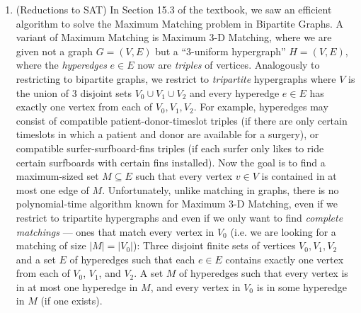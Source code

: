 \documentclass[11pt]{article}
\begin{document}
\begin{enumerate}
\[\varphi(x_0, x_1, x_2, x_3) = (x_0 \vee x_1) \wedge (\neg x_0 \vee x_2) \wedge (\neg x_1 \vee \neg x_2) \wedge (x_2 \vee x_3)\]

\item (Reductions to SAT) In Section 15.3 of the textbook, we saw an efficient algorithm to solve the Maximum Matching problem in Bipartite Graphs. A variant of Maximum Matching is Maximum 3-D Matching, where we are given not a graph $G=(V,E)$ but a ``3-uniform hypergraph'' $H=(V,E)$, where the {\em hyperedges} $e\in E$ now are {\em triples} of vertices.
Analogously to restricting to bipartite graphs, we restrict to {\em tripartite} hypergraphs where $V$ is the union of 3 disjoint sets $V_0\cup V_1 \cup V_2$ and every hyperedge $e\in E$ has exactly one vertex from each of $V_0,V_1,V_2$. For example, hyperedges may consist of
compatible patient-donor-timeslot triples (if there are only certain timeslots in which a patient and donor are available for a surgery),
or compatible surfer-surfboard-fins triples (if each surfer only likes to ride certain surfboards with certain fins installed).
Now the goal is to find a maximum-sized set $M\subseteq E$ such that every vertex $v\in V$ is contained in at most one edge of $M$.
Unfortunately, unlike matching in graphs, there is no polynomial-time algorithm known for Maximum 3-D Matching, even if we restrict to tripartite hypergraphs and even if we only want to find {\em complete matchings} --- ones that match every vertex in $V_0$ (i.e. we are looking for a matching of size $|M|=|V_0|$):
{Three disjoint finite sets of vertices $V_0,V_1,V_2$ and a set $E$ of hyperedges  such that each $e\in E$ contains exactly one vertex from each of $V_0$, $V_1$, and $V_2$.}
{A set $M$ of hyperedges such that every vertex is in at most one hyperedge in $M$, and every vertex in $V_0$ is in some hyperedge in $M$ (if one exists).
}

\begin{figure}[h]
\centering
{}
\end{figure}
\end{enumerate}
\end{document}
